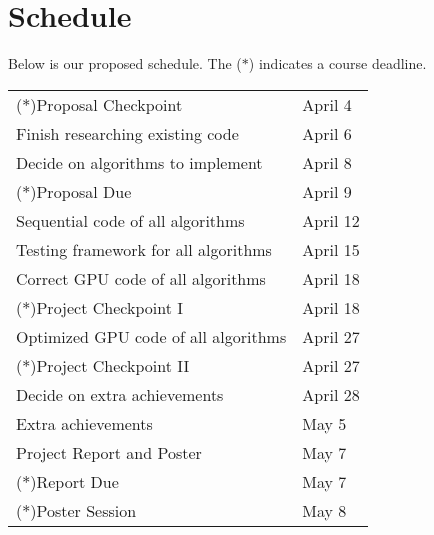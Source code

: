 \documentclass[12pt]{article}
\begin{document}
\section{Schedule}
Below is our proposed schedule. The ($*$) indicates a course deadline.
\begin{center}
	\begin{tabular}{l l}
		($*$)Proposal Checkpoint & April 4 \\
		Finish researching existing code & April 6 \\
		Decide on algorithms to implement & April 8 \\
		($*$)Proposal Due & April 9 \\
		Sequential code of all algorithms & April 12 \\
		Testing framework for all algorithms & April 15 \\
		Correct GPU code of all algorithms & April 18 \\
		($*$)Project Checkpoint I & April 18 \\
		Optimized GPU code of all algorithms & April 27 \\
		($*$)Project Checkpoint II & April 27 \\
		Decide on extra achievements & April 28 \\
		Extra achievements & May 5 \\
		Project Report and Poster & May 7 \\
		($*$)Report Due & May 7 \\
		($*$)Poster Session & May 8
	\end{tabular}
\end{center}



\end{document}
